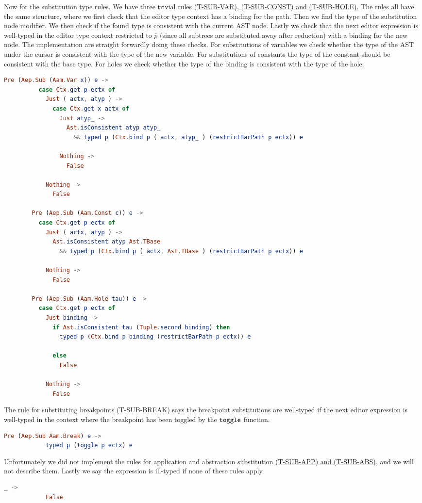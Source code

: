 Now for the substitution type rules. We have three trivial rules
\hyperref[fig:asttyperules]{(T-SUB-VAR), (T-SUB-CONST) and (T-SUB-HOLE)}. The
rules all have the same structure, where we first check that the editor type
context has a binding for the path. Then we find the type of the substitution
node modifier. We then check if the found type is consistent with the current
AST node. Lastly we check that the next editor expression is well-typed in the
editor type context restricted to $\bar{p}$ (since all subtrees are substituted
away after reduction) with a binding for the new node. The implementation are
straight forwardly doing these checks. For substitutions of variables we check
whether the type of the AST under the cursor is consistent with the type of the
new variable. For substitutions of constants the type of the constant should be
consistent with the base type. For holes we check whether the type of the
binding is consistent with the type of the hole.
\begin{lstlisting}[language=elm,%
    gobble=8,%
    ]
        Pre (Aep.Sub (Aam.Var x)) e ->
          case Ctx.get p ectx of
            Just ( actx, atyp ) ->
              case Ctx.get x actx of
                Just atyp_ ->
                  Ast.isConsistent atyp atyp_
                    && typed p (Ctx.bind p ( actx, atyp_ ) (restrictBarPath p ectx)) e

                Nothing ->
                  False

            Nothing ->
              False

        Pre (Aep.Sub (Aam.Const c)) e ->
          case Ctx.get p ectx of
            Just ( actx, atyp ) ->
              Ast.isConsistent atyp Ast.TBase
                && typed p (Ctx.bind p ( actx, Ast.TBase ) (restrictBarPath p ectx)) e

            Nothing ->
              False

        Pre (Aep.Sub (Aam.Hole tau)) e ->
          case Ctx.get p ectx of
            Just binding ->
              if Ast.isConsistent tau (Tuple.second binding) then
                typed p (Ctx.bind p binding (restrictBarPath p ectx)) e

              else
                False

            Nothing ->
              False
\end{lstlisting}
The rule for substituting breakpoints
\hyperref[fig:asttyperules]{(T-SUB-BREAK)} says the breakpoint substitutions
are well-typed if the next editor expression is well-typed in the context where
the breakpoint has been toggled by the $\texttt{toggle}$ function.
\begin{lstlisting}[language=elm,%
    gobble=8,%
    ]
        Pre (Aep.Sub Aam.Break) e ->
            typed p (toggle p ectx) e
\end{lstlisting}
Unfortunately we did not implement the rules for application and abstraction
substitution \hyperref[fig:asttyperules]{(T-SUB-APP) and (T-SUB-ABS)}, and we
will not describe them. Lastly we say the expression is ill-typed if none of
these rules apply.
\begin{lstlisting}[language=elm,%
    gobble=8,%
    ]
        _ ->
            False
\end{lstlisting}


